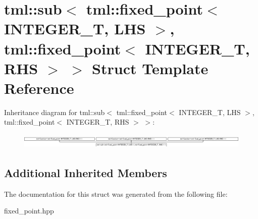 \hypertarget{structtml_1_1sub_3_01tml_1_1fixed__point_3_01INTEGER__T_00_01LHS_01_4_00_01tml_1_1fixed__point_377e8478a7782c77a6bed9f375dc30bd2}{\section{tml\+:\+:sub$<$ tml\+:\+:fixed\+\_\+point$<$ I\+N\+T\+E\+G\+E\+R\+\_\+\+T, L\+H\+S $>$, tml\+:\+:fixed\+\_\+point$<$ I\+N\+T\+E\+G\+E\+R\+\_\+\+T, R\+H\+S $>$ $>$ Struct Template Reference}
\label{structtml_1_1sub_3_01tml_1_1fixed__point_3_01INTEGER__T_00_01LHS_01_4_00_01tml_1_1fixed__point_377e8478a7782c77a6bed9f375dc30bd2}
}
Inheritance diagram for tml\+:\+:sub$<$ tml\+:\+:fixed\+\_\+point$<$ I\+N\+T\+E\+G\+E\+R\+\_\+\+T, L\+H\+S $>$, tml\+:\+:fixed\+\_\+point$<$ I\+N\+T\+E\+G\+E\+R\+\_\+\+T, R\+H\+S $>$ $>$\+:\begin{figure}[H]
\begin{center}
\leavevmode
\includegraphics[height=0.739274cm]{structtml_1_1sub_3_01tml_1_1fixed__point_3_01INTEGER__T_00_01LHS_01_4_00_01tml_1_1fixed__point_377e8478a7782c77a6bed9f375dc30bd2}
\end{center}
\end{figure}
\subsection*{Additional Inherited Members}


The documentation for this struct was generated from the following file\+:\begin{DoxyCompactItemize}
\item 
fixed\+\_\+point.\+hpp\end{DoxyCompactItemize}
